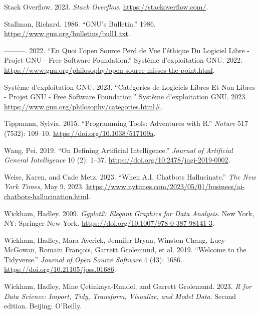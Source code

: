 \documentclass[
  letterpaper,
]{scrbook}
\newlength{\cslhangindent}
\newlength{\cslentryspacingunit} %
\newenvironment{CSLReferences}[2] %
 {%
  \setlength{\parindent}{0pt}
  \ifodd #1
  \let\oldpar\par
  \def\par{\hangindent=\cslhangindent\oldpar}
  \fi
  \setlength{\parskip}{#2\cslentryspacingunit}
 }%
 {}
\begin{document}
\begin{CSLReferences}{1}{0}
\leavevmode{}%
Stack Overflow. 2023. \emph{Stack {Overflow}}.
\url{https://stackoverflow.com/}.

\leavevmode{}%
Stallman, Richard. 1986. {``{GNU}'s {Bulletin}.''} 1986.
\url{https://www.gnu.org/bulletins/bull1.txt}.

\leavevmode{}%
---------. 2022. {``En Quoi l'open Source Perd de Vue l'éthique Du
Logiciel Libre - {Projet GNU} - {Free Software Foundation}.''} {Système
d'exploitation GNU}. 2022.
\url{https://www.gnu.org/philosophy/open-source-misses-the-point.html}.

\leavevmode{}%
Système d'exploitation GNU. 2023. {``Catégories de Logiciels Libres Et
Non Libres - {Projet GNU} - {Free Software Foundation}.''} {Système
d'exploitation GNU}. 2023.
\url{https://www.gnu.org/philosophy/categories.html\#}.

\leavevmode{}%
Tippmann, Sylvia. 2015. {``Programming Tools: {Adventures} with {R}.''}
\emph{Nature} 517 (7532): 109--10.
\url{https://doi.org/10.1038/517109a}.

\leavevmode{}%
Wang, Pei. 2019. {``On {Defining Artificial Intelligence}.''}
\emph{Journal of Artificial General Intelligence} 10 (2): 1--37.
\url{https://doi.org/10.2478/jagi-2019-0002}.

\leavevmode{}%
Weise, Karen, and Cade Metz. 2023. {``When {A}.{I}. {Chatbots
Hallucinate}.''} \emph{The New York Times}, May 9, 2023.
\url{https://www.nytimes.com/2023/05/01/business/ai-chatbots-hallucination.html}.

\leavevmode{}%
Wickham, Hadley. 2009. \emph{Ggplot2: {Elegant Graphics} for {Data
Analysis}}. {New York, NY}: {Springer New York}.
\url{https://doi.org/10.1007/978-0-387-98141-3}.

\leavevmode{}%
Wickham, Hadley, Mara Averick, Jennifer Bryan, Winston Chang, Lucy
McGowan, Romain François, Garrett Grolemund, et al. 2019. {``Welcome to
the {Tidyverse}.''} \emph{Journal of Open Source Software} 4 (43): 1686.
\url{https://doi.org/10.21105/joss.01686}.

\leavevmode{}%
Wickham, Hadley, Mine Çetinkaya-Rundel, and Garrett Grolemund. 2023.
\emph{R for Data Science: Import, Tidy, Transform, Visualize, and Model
Data}. Second edition. {Beijing}: {O'Reilly}.


\end{CSLReferences}
\end{document}
